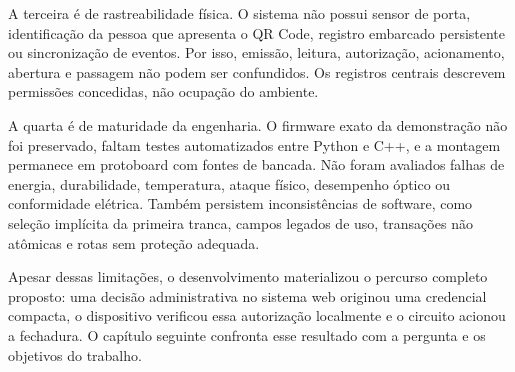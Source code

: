 A terceira é de rastreabilidade física. O sistema não possui sensor de porta, identificação da pessoa que apresenta o QR Code, registro embarcado persistente ou sincronização de eventos. Por isso, emissão, leitura, autorização, acionamento, abertura e passagem não podem ser confundidos. Os registros centrais descrevem permissões concedidas, não ocupação do ambiente.

A quarta é de maturidade da engenharia. O firmware exato da demonstração não foi preservado, faltam testes automatizados entre Python e C++, e a montagem permanece em protoboard com fontes de bancada. Não foram avaliados falhas de energia, durabilidade, temperatura, ataque físico, desempenho óptico ou conformidade elétrica. Também persistem inconsistências de software, como seleção implícita da primeira tranca, campos legados de uso, transações não atômicas e rotas sem proteção adequada.

Apesar dessas limitações, o desenvolvimento materializou o percurso completo proposto: uma decisão administrativa no sistema web originou uma credencial compacta, o dispositivo verificou essa autorização localmente e o circuito acionou a fechadura. O capítulo seguinte confronta esse resultado com a pergunta e os objetivos do trabalho.
